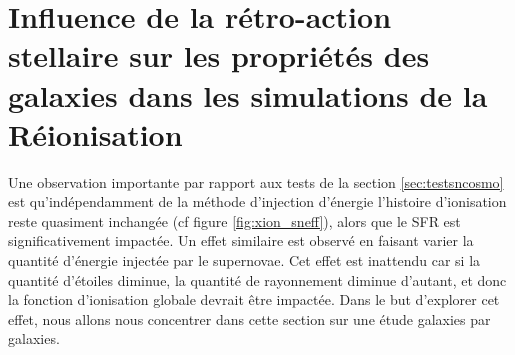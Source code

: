 \chapter{Influence de la rétro-action stellaire sur les propriétés des galaxies dans les simulations de la Réionisation}
\label{sec:galaxies}


Une observation importante par rapport aux tests de la section \ref{sec:testsncosmo} est qu’indépendamment de la méthode d'injection d'énergie l'histoire d'ionisation reste quasiment inchangée (cf figure \ref{fig:xion_sneff}), alors que le \ac{SFR} est significativement impactée.
Un effet similaire est observé en faisant varier la quantité d'énergie injectée par le supernovae.
Cet effet est inattendu car si la quantité d'étoiles diminue, la quantité de rayonnement diminue d'autant, et donc la fonction d'ionisation globale devrait être impactée.
Dans le but d'explorer cet effet, nous allons nous concentrer dans cette section sur une étude galaxies par galaxies.


